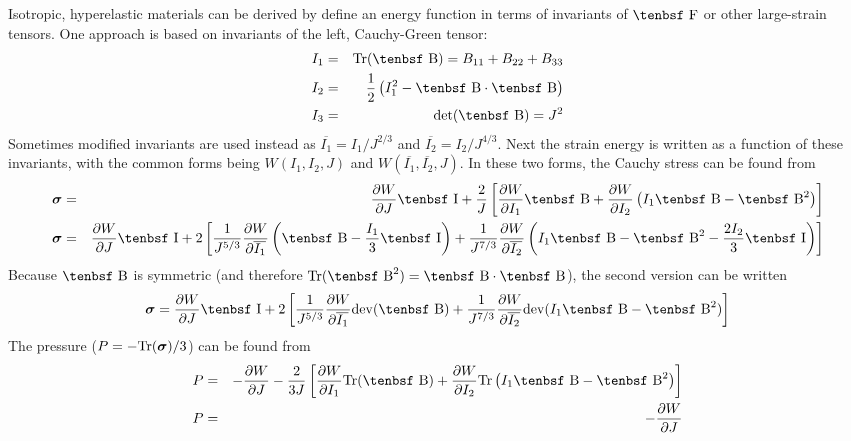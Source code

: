 \documentclass[11pt]{book}
\newcommand{\tens}[1]{\boldsymbol{\mathsf{#1}}}
\def\B{\hbox{\tenbsf B}}
\def\F{\hbox{\tenbsf F}}
\def\I{\hbox{\tenbsf I}}
\begin{document}
Isotropic, hyperelastic materials can be derived by define an energy function in terms of invariants of $\F$ or other large-strain tensors. One approach is based on invariants of the left, Cauchy-Green tensor:
\begin{eqnarray}
          I_1 & = & {\rm Tr}(\B) = B_{11} + B_{22} + B_{33}  \\
          I_2 & = & {1\over2}\left(I_1^2 - \B\cdot \B\right) \\
          I_3 & = & {\rm det}(\B) = J^2
\end{eqnarray}
Sometimes modified invariants are used instead as $\overline{I_1} = I_1/J^{2/3}$ and $\overline{I_2} = I_2/J^{4/3}$. Next the strain energy is written as a function of these invariants, with the common forms being $W(I_1,I_2,J)$ and $W(\overline{I_1},\overline{I_2},J)$. In these two forms, the Cauchy stress can be found from
\begin{eqnarray}
   \tens\sigma & = & {\partial W\over \partial J}\I + {2\over J}\left[ {\partial W\over \partial I_1}\B
                                             + {\partial W\over \partial I_2}\left(I_1\B- \B^2\right)
                                            \right]      \\
   \tens\sigma & = & {\partial W\over \partial J}\I + 2\left[ {1\over J^{5/3}}
                           {\partial W\over \partial \overline{I_1}}\left(\B -  {I_1\over 3}\I\right)
                           + {1\over J^{7/3}}{\partial W\over \partial \overline{I_2}}\left( I_1 \B- \B^2 - {2I_2\over 3}\I  \right)
                             \right]
\end{eqnarray}
Because $\B$ is symmetric (and therefore ${\rm Tr}(\B^2) = \B\cdot\B$), the second version can be written
\begin{equation}
           \tens\sigma = {\partial W\over \partial J}\I + 2\left[ {1\over J^{5/3}}
                                           {\partial W\over \partial \overline{I_1}}{\rm dev}(\B)
                                        + {1\over J^{7/3}}{\partial W\over \partial \overline{I_2}}{\rm dev}( I_1 \B- \B^2)
                                           \right]
\end{equation}
The pressure ($P = -{\rm Tr}(\tens\sigma)/3$) can be found from
\begin{eqnarray}
   P & = & -{\partial W\over \partial J} - {2\over 3J}\left[ {\partial W\over \partial I_1}{\rm Tr}(\B)
                                             + {\partial W\over \partial I_2}{\rm Tr}\left(I_1\B- \B^2\right)
                                            \right]      \\
   P & = & - {\partial W\over \partial J}
\end{eqnarray}
\end{document}
